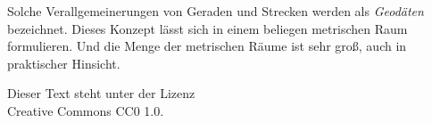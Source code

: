\documentclass[a4paper,10pt,fleqn,twocolumn,twoside,dvipdfmx]{scrartcl}
\begin{document}
Solche Verallgemeinerungen von Geraden und Strecken werden als
\emph{Geodäten} bezeichnet. Dieses Konzept lässt sich in einem
beliegen metrischen Raum formulieren. Und die Menge der metrischen
Räume ist sehr groß, auch in praktischer Hinsicht.

\vfill\noindent
Dieser Text steht unter der Lizenz\\
Creative Commons CC0 1.0.
\end{document}
